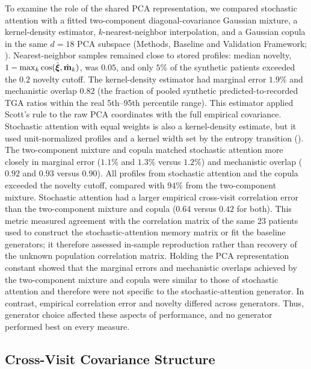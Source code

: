 To examine the role of the shared PCA representation, we compared stochastic attention
with a fitted two-component diagonal-covariance Gaussian mixture, a kernel-density estimator, $k$-nearest-neighbor interpolation, and a
Gaussian copula in the same $d{=}18$ PCA subspace
(Methods, Baseline and Validation Framework; ).
Nearest-neighbor samples remained close to
stored profiles: median novelty, $1-\max_k\cos(\hat{\boldsymbol{\xi}},\hat{\mathbf{m}}_k)$, was $0.05$,
and only $5\%$ of the synthetic patients exceeded the $0.2$ novelty cutoff.
The kernel-density estimator had marginal error $1.9\%$ and mechanistic overlap $0.82$ (the fraction of pooled synthetic
predicted-to-recorded TGA ratios within the real 5th--95th percentile range). This estimator applied Scott's rule to the raw PCA coordinates with the full
empirical covariance. Stochastic attention with equal weights is also a kernel-density
estimate, but it used unit-normalized profiles and a kernel width set by the entropy
transition (). The two-component mixture and
copula matched stochastic attention more closely in marginal error ($1.1\%$ and $1.3\%$
versus $1.2\%$) and mechanistic overlap ($0.92$ and $0.93$ versus $0.90$). All profiles from
stochastic attention and the copula exceeded the novelty cutoff, compared with $94\%$ from
the two-component mixture. Stochastic attention had a larger empirical cross-visit correlation error
than the two-component mixture and copula ($0.64$ versus $0.42$ for both). This metric measured
agreement with the correlation matrix of the same $23$ patients used to construct the
stochastic-attention memory matrix or fit the baseline generators; it therefore assessed
in-sample reproduction rather than recovery of the unknown population correlation matrix.
Holding the PCA representation constant showed that the marginal errors and mechanistic
overlaps achieved by the two-component mixture and copula were similar to those of stochastic
attention and therefore were not specific to the stochastic-attention generator. In contrast,
empirical correlation error and novelty differed across generators. Thus, generator choice
affected these aspects of performance, and no generator performed best on every measure.

\subsection{Cross-Visit Covariance Structure}
\label{sec:results-l2}

